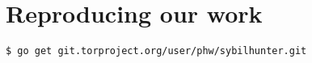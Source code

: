 \appendix

\section{Reproducing our work}
\begin{lstlisting}
$ go get git.torproject.org/user/phw/sybilhunter.git
\end{lstlisting}
